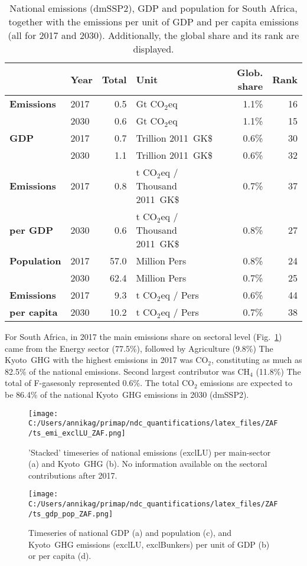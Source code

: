 \documentclass[12pt]{article}
\begin{document}
 \begin{table}[H]
 \centering
 \caption{National emissions (dmSSP2), GDP and population for South Africa, together with the emissions per unit of GDP and per capita emissions (all for 2017 and 2030). 
 Additionally, the global share and its rank are displayed.}
 \label{tab:overview}
 \begin{tabular}{l || l r l r r}
 \bfseries  & \bfseries Year & \bfseries Total & \bfseries Unit & \bfseries Glob. share & \bfseries Rank \tabularnewline \hline \hline
 \bfseries Emissions & 2017 & 0.5 & Gt CO$_2$eq & 1.1\% & 16 \tabularnewline 
 \bfseries  & 2030 & 0.6 & Gt CO$_2$eq & 1.1\% & 15 \tabularnewline \hline
 \bfseries GDP & 2017 & 0.7 & Trillion 2011~GK\$ & 0.6\% & 30 \tabularnewline 
 \bfseries  & 2030 & 1.1 & Trillion 2011~GK\$ & 0.6\% & 32 \tabularnewline \hline
 \bfseries Emissions & 2017 & 0.8 & t CO$_2$eq / Thousand 2011~GK\$ & 0.7\% & 37 \tabularnewline 
 \bfseries per GDP & 2030 & 0.6 & t CO$_2$eq / Thousand 2011~GK\$ & 0.8\% & 27 \tabularnewline \hline
 \bfseries Population & 2017 & 57.0 & Million Pers & 0.8\% & 24 \tabularnewline 
 \bfseries  & 2030 & 62.4 & Million Pers & 0.7\% & 25 \tabularnewline \hline
 \bfseries Emissions & 2017 & 9.3 & t CO$_2$eq /  Pers & 0.6\% & 44 \tabularnewline 
 \bfseries per capita & 2030 & 10.2 & t CO$_2$eq /  Pers & 0.7\% & 38 \tabularnewline 
 \end{tabular}
 \end{table}

 For South Africa, in 2017 the main emissions share on sectoral level (Fig.~\ref{fig:tsEmi}) came from the Energy sector (77.5\%), followed by Agriculture (9.8\%)
 The Kyoto~GHG with the highest emissions in 2017 was CO$_2$, constituting as much as 82.5\% of the national emissions. 
 Second largest contributor was CH$_4$ (11.8\%)
 The total of F-gasesonly represented 0.6\%.
 The total CO$_2$ emissions are expected to be 86.4\% of the national Kyoto~GHG emissions in 2030 (dmSSP2).

 \begin{figure}[H]
 \centering
 \texttt{[image: C:/Users/annikag/primap/ndc\_quantifications/latex\_files/ZAF/ts\_emi\_exclLU\_ZAF.png]}
 \caption{'Stacked' timeseries of national emissions (exclLU) per main-sector (a) and Kyoto~GHG (b). 
 No information available on the sectoral contributions after 2017.}
 \label{fig:tsEmi}
 \end{figure}

 \begin{figure}[H]
 \centering
 \texttt{[image: C:/Users/annikag/primap/ndc\_quantifications/latex\_files/ZAF/ts\_gdp\_pop\_ZAF.png]}
 \caption{Timeseries of national GDP (a) and population (c), and Kyoto~GHG emissions (exclLU, exclBunkers) per unit of GDP (b) or per capita (d).}
 \label{fig:tsSocioEco}
 \end{figure}
\end{document}
